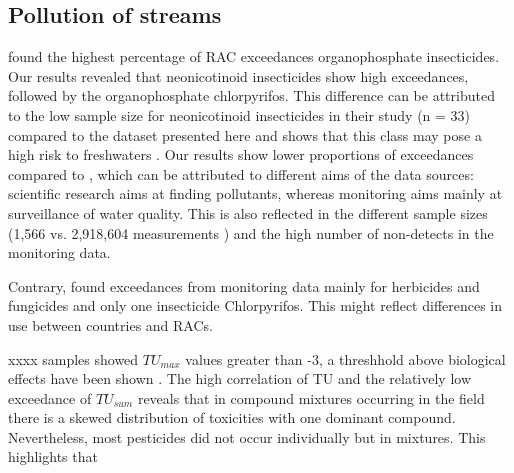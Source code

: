 \documentclass[journal=esthag,manuscript=article]{achemso}
\begin{document}








\subsection{Pollution of streams}


\citet{stehle_pesticide_2015} found the highest percentage of RAC exceedances organophosphate insecticides. 
Our results revealed that neonicotinoid insecticides show high exceedances, followed by the organophosphate chlorpyrifos. 
This difference can be attributed to the low sample size for neonicotinoid insecticides in their study (n = 33) compared to the dataset presented here  and shows that this class may pose a high risk to freshwaters .
Our results show lower proportions of exceedances compared to \citet{stehle_pesticide_2015}, which can be attributed to different aims of the data sources: scientific research aims at finding pollutants, whereas monitoring aims mainly at surveillance of water quality. 
This is also reflected in the different sample sizes (1,566 vs. 2,918,604 measurements ) and the high number of non-detects in the monitoring data.

Contrary, \citet{knauer_pesticides_2016} found exceedances from monitoring data mainly for herbicides and fungicides and only one insecticide Chlorpyrifos.
This might reflect differences in use between countries and RACs.


xxxx samples showed $TU_{max}$ values greater than -3, a threshhold above biological effects have been shown . 
The high correlation of TU and the relatively low exceedance of $TU_{sum}$ reveals that in compound mixtures occurring in the field there is a skewed distribution of toxicities with one dominant compound.
Nevertheless, most pesticides did not occur individually but in mixtures.
This highlights that 





\end{document}

